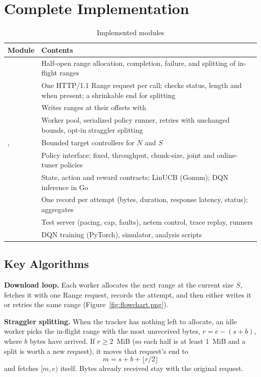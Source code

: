 \chapter{Complete Implementation}
\begin{table}[H]\centering
\caption{Implemented modules}\label{tab:modules}
\begin{tabularx}{\linewidth}{@{}lL@{}}
\toprule
\textbf{Module} & \textbf{Contents}\\
\midrule
{} & Half-open range allocation, completion, failure, and splitting of in-flight ranges\\
 & One HTTP/1.1 Range request per call; checks status, length and  when present; a shrinkable end for splitting\\
 & Writes ranges at their offsets with \\
 & Worker pool, serialized policy runner, retries with unchanged bounds, opt-in straggler splitting\\
,  & Bounded target controllers for $N$ and $S$\\
 & Policy interface; fixed, throughput, chunk-size, joint and online-tuner policies\\
 & State, action and reward contracts; LinUCB (Gonum); DQN inference in Go\\
 & One record per attempt (bytes, duration, response latency, status); aggregates\\
 & Test server (pacing, cap, faults), netem control, trace replay, runners\\
 & DQN training (PyTorch), simulator, analysis scripts\\
\bottomrule
\end{tabularx}
\end{table}

\section{Key Algorithms}
\textbf{Download loop.} Each worker allocates the next range at the current size $S$, fetches it with one Range request, records the attempt, and then either writes it or retries the same range (Figure~\ref{fig:flowchart.png}).

\textbf{Straggler splitting.} When the tracker has nothing left to allocate, an idle worker picks the in-flight range with the most unreceived bytes, $r = e - (s + b)$, where $b$ bytes have arrived. If $r \ge 2$~MiB (so each half is at least 1~MiB and a split is worth a new request), it moves that request's end to
\begin{equation}
m = s + b + \lfloor r/2 \rfloor
\end{equation}
and fetches $[m, e)$ itself. Bytes already received stay with the original request.

